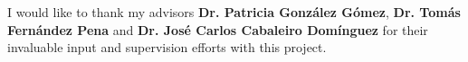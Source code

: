 \section*{}

\vspace*{\fill}

\begin{flushright}
I would like to thank my advisors \textbf{Dr. Patricia Gonz\'alez G\'omez}, \textbf{Dr. Tom\'as Fern\'andez Pena} and \textbf{Dr. Jos\'e Carlos Cabaleiro Dom\'inguez} for their invaluable input and supervision efforts with this project.
\end{flushright}

\vspace*{\fill}